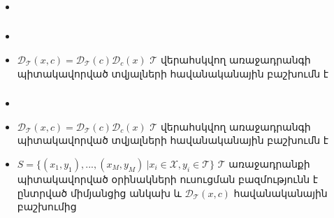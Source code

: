 \documentclass[10pt]{beamer}
\begin{document}
\begin{frame}[t]
\frametitle{}
\begin{itemize}
\vspace{5mm}
\item  {}
\end{itemize}
\end{frame}



\begin{frame}[t]
\frametitle{}
\begin{itemize}
\vspace{5mm}
\item  {}

\item $\mathcal{D}_{\mathcal{T}}(x, c) = \mathcal{D}_{\mathcal{T}}(c)\mathcal{D}_{c}(x)$ $\mathcal{T}$ վերահսկվող առաջադրանգի պիտակավորված տվյալների հավանականային բաշխումն է

\end{itemize}
\end{frame}



\begin{frame}[t]
\frametitle{}
\begin{itemize}
\vspace{5mm}
\item  {}

\item $\mathcal{D}_{\mathcal{T}}(x, c) = \mathcal{D}_{\mathcal{T}}(c)\mathcal{D}_{c}(x)$ $\mathcal{T}$ վերահսկվող առաջադրանգի պիտակավորված տվյալների հավանականային բաշխումն է

\item $S = \{(x_1, y_1), ..., (x_M, y_M) \ | x_i \in \mathcal{X}, y_i \in \mathcal{T}\}$ $\mathcal{T}$ առաջադրանքի պիտակավորված օրինակների ուսուցման բազմությունն է ընտրված միմյանցից անկախ և $\mathcal{D}_{\mathcal{T}}(x, c)$ հավանականային բաշխումից
\end{itemize}
\end{frame}

\subsection{}
\end{document}
